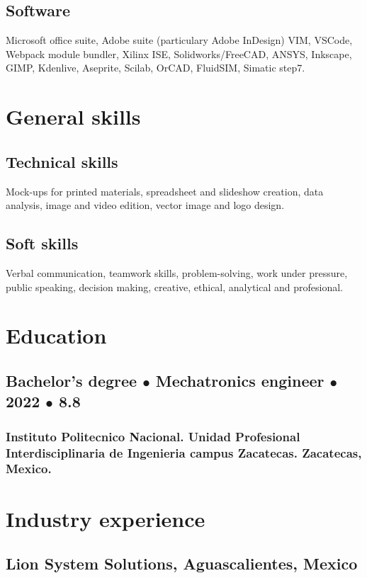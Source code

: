 \documentclass{article}
\begin{document}
    \subsection{Software}

    Microsoft office suite, Adobe suite (particulary Adobe InDesign) VIM, VSCode, Webpack module bundler, Xilinx ISE, Solidworks/FreeCAD, ANSYS, Inkscape, GIMP, Kdenlive, Aseprite, Scilab, OrCAD, FluidSIM, Simatic step7.


  \section{General skills}

  \subsection{Technical skills}
  Mock-ups for printed materials, spreadsheet and slideshow creation, data analysis, image and video edition, vector image and logo design.

  \subsection{Soft skills}
  Verbal communication, teamwork skills, problem-solving, work under pressure, public speaking, decision making, creative, ethical, analytical and profesional.%


  \section{Education}%

  \subsection{Bachelor's degree $\bullet$  Mechatronics engineer $\bullet$ 2022 $\bullet$ 8.8}
  \subsubsection{Instituto Politecnico Nacional.
  Unidad Profesional Interdisciplinaria de Ingenieria campus Zacatecas.
  Zacatecas, Mexico.}%


  \section{Industry experience}%

  \subsection{Lion System Solutions, Aguascalientes, Mexico}
\end{document}
